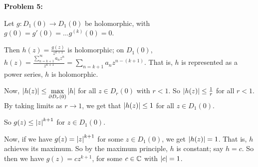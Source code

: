 \documentclass[a4paper,12pt]{article}
\begin{document}
{\bf Problem 5:}

Let $g:D_1(0) \to D_1(0)$ be holomorphic, with $g(0)=g'(0)= \ldots g^{(k)}(0) = 0$.

Then $h(z) = \frac{g(z)}{z^{k+1}}$ is holomorphic; on $D_1(0)$, $h(z) = \frac{\sum\limits_{n=k+1}^\infty a_nz^n}{z^{k+1}} = \sum\limits_{n=k+1} a_nz^{n-(k+1)}$. That is, $h$ is represented as a power series, $h$ is holomorphic.

Now, $\left\lvert h(z) \right\rvert \leq \max\limits_{\partial D_r(0)} \left\lvert h \right\rvert$ for all $z \in D_r(0)$ with $r<1$.  So $\left\lvert h(z) \right\rvert \leq \frac{1}{r}$ for all $r < 1$. By taking limits as $r \to 1$, we get that $\left\lvert h(z) \right\rvert \leq 1$ for all $z \in D_1(0)$.

So $g(z) \leq \left\lvert z \right\rvert^{k+1}$ for $z \in D_1(0)$.

Now, if we have $g(z) = \left\lvert z \right\rvert^{k+1}$ for some $z \in D_1(0)$, we get $\left\lvert h(z) \right\rvert =1$. That is, $h$ achieves its maximum. So by the maximum principle, $h$ is constant; say $h = c$. So then we have $g(z) = cz^{k+1}$, for some $c \in \mathbb{C}$ with $\left\lvert c \right\rvert=1$. 

\shunt
\end{document}
